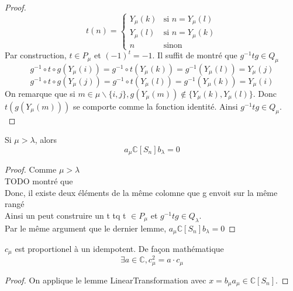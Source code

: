 \begin{proof}
    \[ t(n) = \begin{cases} Y_{\mu}(k) & \text{si } n=Y_{\mu}(l)\\
                            Y_{\mu}(l) & \text{si } n=Y_{\mu}(k)\\
                            n & \text{sinon} 
    \end{cases}\]
    Par construction, $t \in P_{\mu}$ et $(-1)^t = -1$. Il suffit de montré que $g^{-1} t g \in Q_{\mu}$
    \[ g^{-1} \circ t \circ g(Y_{\mu}(i)) = g^{-1} \circ t (Y_{\mu}(k)) = g^{-1}(Y_{\mu}(l)) = Y_{\mu}(j) \]
    \[ g^{-1} \circ t \circ g(Y_{\mu}(j)) = g^{-1} \circ t (Y_{\mu}(l)) = g^{-1}(Y_{\mu}(k)) = Y_{\mu}(i) \]
    On remarque que si $m \in \mu \backslash \{i,j\}, g(Y_{\mu}(m)) \notin \{Y_{\mu}(k), Y_{\mu}(l)\}$. Donc $t(g(Y_{\mu}(m)))$ se comporte comme la fonction identité. Ainsi $g^{-1} t g \in Q_{\mu}$.\\
\end{proof}

\begin{lemma}[SmallerImpZero]
    \label{SmallerImpZero}
    Si $\mu > \lambda$, alors\\
    \[a_{\mu} \mathbb{C}[S_{n}] b_{\lambda} = 0\]
\end{lemma}
\begin{proof}
    Comme $\mu > \lambda$\\
    TODO montré que\\
    Donc, il existe deux éléments de la même colomne que g envoit sur la même rangé\\
    Ainsi un peut construire un t tq t $\in P_{\mu}$ et $g^{-1} t g \in Q_{\lambda}$.\\
    Par le même argument que le dernier lemme, $a_{\mu} \mathbb{C}[S_{n}] b_{\lambda} = 0$
\end{proof}

\begin{lemma}[CuPropIdempotent]
    \label{CuIdempotent}
    $c_{\mu}$ est proportionel à un idempotent. De façon mathématique
    \[\exists a \in \mathbb{C}, c_{\mu}^{2} = a \cdot c_{\mu} \]
\end{lemma}
\begin{proof}
    On applique le lemme LinearTransformation avec $x = b_{\mu} a_{\mu} \in \mathbb{C}[S_{n}]$.
\end{proof}